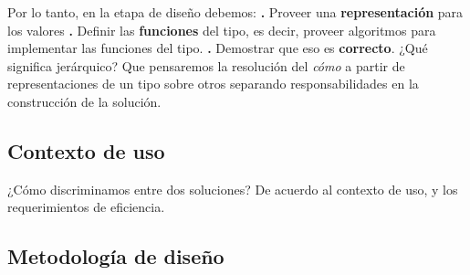 \documentclass[10pt,a4paper]{article}
\begin{document}
\newline
\newline
Por lo tanto, en la etapa de diseño debemos:
\newline
\newline
\textbf{.} Proveer una \textbf{representación} para los valores
\newline
\newline
\textbf{.} Definir las \textbf{funciones} del tipo, es decir, proveer algoritmos para implementar las funciones del tipo. 
\newline
\newline
\textbf{.} Demostrar que eso es \textbf{correcto}.
\newline
\newline
¿Qué significa jerárquico?
\newline
\newline
Que pensaremos la resolución del \textit{cómo} a partir de representaciones de un tipo sobre otros separando responsabilidades en la construcción de la solución. 

\subsection{Contexto de uso}

¿Cómo discriminamos entre dos soluciones?
\newline
\newline
De acuerdo al contexto de uso, y los requerimientos de eficiencia.

\subsection{Metodología de diseño}
\end{document}
